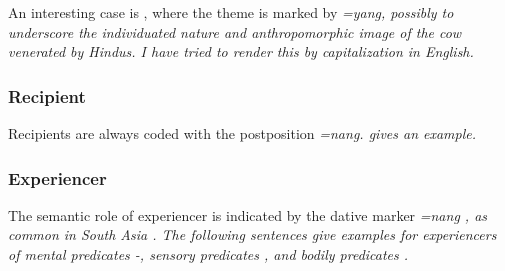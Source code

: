 An interesting case is , where the theme is marked by \em =yang\em,  possibly to underscore the individuated nature and anthropomorphic image of the cow venerated by Hindus. I have tried to render this by capitalization in English.


\subsubsection{Recipient}\label{sec:func:Recipient}
Recipients are always coded with the postposition \em =nang\em.  gives an example.




\subsubsection{Experiencer}\label{sec:func:Experiencer}
The semantic role of experiencer is indicated by the dative marker \em =nang \em  \citep{Ansaldo2005ms,Ansaldo2008genesis} , as common in South Asia \citep{Masica1976,Sridhar1976cls,Sridhar1976sils,Sridhar1979,VermaEtAlEd1990,
Abbi1994,BhaskararaoEtAlEd2004I,BhaskararaoEtAlEd2004II}.
The following sentences give examples for experiencers of mental predicates -, sensory  predicates , and bodily predicates .





